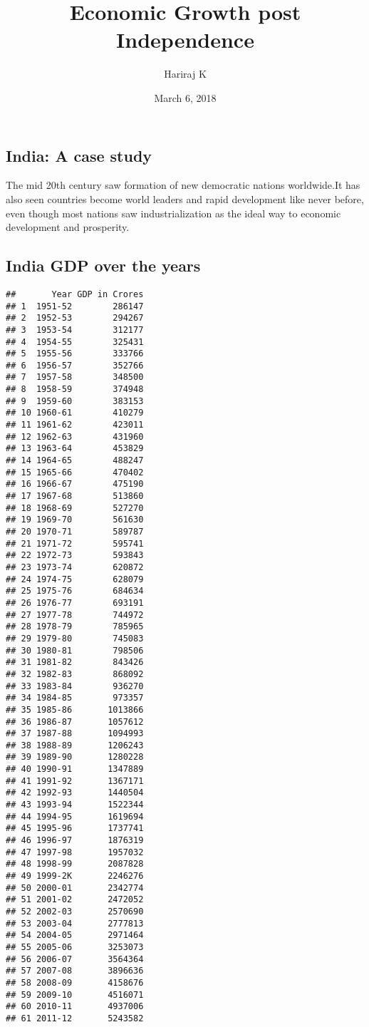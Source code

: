 \documentclass[]{article}
\title{Economic Growth post Independence}
\author{Hariraj K}
\date{March 6, 2018}
\begin{document}
\maketitle

\subsection{India: A case study}\label{india-a-case-study}

The mid 20th century saw formation of new democratic nations
worldwide.It has also seen countries become world leaders and rapid
development like never before, even though most nations saw
industrialization as the ideal way to economic development and
prosperity.

\subsection{India GDP over the years}\label{india-gdp-over-the-years}

\begin{verbatim}
##       Year GDP in Crores
## 1  1951-52        286147
## 2  1952-53        294267
## 3  1953-54        312177
## 4  1954-55        325431
## 5  1955-56        333766
## 6  1956-57        352766
## 7  1957-58        348500
## 8  1958-59        374948
## 9  1959-60        383153
## 10 1960-61        410279
## 11 1961-62        423011
## 12 1962-63        431960
## 13 1963-64        453829
## 14 1964-65        488247
## 15 1965-66        470402
## 16 1966-67        475190
## 17 1967-68        513860
## 18 1968-69        527270
## 19 1969-70        561630
## 20 1970-71        589787
## 21 1971-72        595741
## 22 1972-73        593843
## 23 1973-74        620872
## 24 1974-75        628079
## 25 1975-76        684634
## 26 1976-77        693191
## 27 1977-78        744972
## 28 1978-79        785965
## 29 1979-80        745083
## 30 1980-81        798506
## 31 1981-82        843426
## 32 1982-83        868092
## 33 1983-84        936270
## 34 1984-85        973357
## 35 1985-86       1013866
## 36 1986-87       1057612
## 37 1987-88       1094993
## 38 1988-89       1206243
## 39 1989-90       1280228
## 40 1990-91       1347889
## 41 1991-92       1367171
## 42 1992-93       1440504
## 43 1993-94       1522344
## 44 1994-95       1619694
## 45 1995-96       1737741
## 46 1996-97       1876319
## 47 1997-98       1957032
## 48 1998-99       2087828
## 49 1999-2K       2246276
## 50 2000-01       2342774
## 51 2001-02       2472052
## 52 2002-03       2570690
## 53 2003-04       2777813
## 54 2004-05       2971464
## 55 2005-06       3253073
## 56 2006-07       3564364
## 57 2007-08       3896636
## 58 2008-09       4158676
## 59 2009-10       4516071
## 60 2010-11       4937006
## 61 2011-12       5243582
\end{verbatim}
\end{document}
